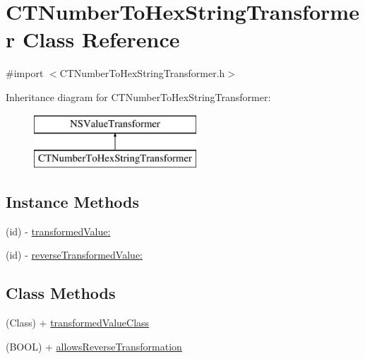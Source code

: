 \hypertarget{interface_c_t_number_to_hex_string_transformer}{\section{C\-T\-Number\-To\-Hex\-String\-Transformer Class Reference}
\label{interface_c_t_number_to_hex_string_transformer}
}


{\ttfamily \#import $<$C\-T\-Number\-To\-Hex\-String\-Transformer.\-h$>$}

Inheritance diagram for C\-T\-Number\-To\-Hex\-String\-Transformer\-:\begin{figure}[H]
\begin{center}
\leavevmode
\includegraphics[height=2.000000cm]{interface_c_t_number_to_hex_string_transformer}
\end{center}
\end{figure}
\subsection*{Instance Methods}
\begin{DoxyCompactItemize}
\item 
(id) -\/ \hyperlink{interface_c_t_number_to_hex_string_transformer_ae4be8dcda663f1dbc6e12a8eb915ce34}{transformed\-Value\-:}
\item 
(id) -\/ \hyperlink{interface_c_t_number_to_hex_string_transformer_a00b54742110417a4a932da2a0277c7ad}{reverse\-Transformed\-Value\-:}
\end{DoxyCompactItemize}
\subsection*{Class Methods}
\begin{DoxyCompactItemize}
\item 
(Class) + \hyperlink{interface_c_t_number_to_hex_string_transformer_a2ab81e9c3b57ee99a0d25c1f240ed59b}{transformed\-Value\-Class}
\item 
(B\-O\-O\-L) + \hyperlink{interface_c_t_number_to_hex_string_transformer_ab37052d53b55b38997a5c3c29f597134}{allows\-Reverse\-Transformation}
\end{DoxyCompactItemize}


